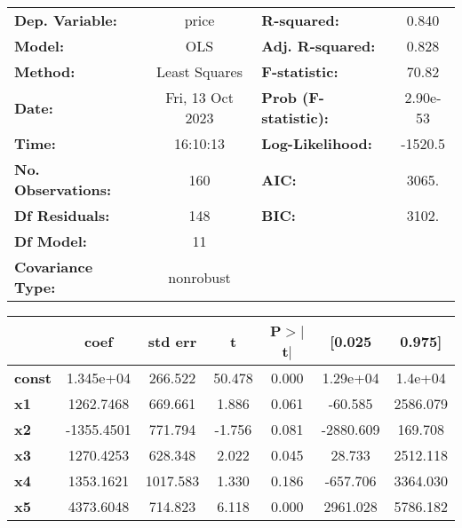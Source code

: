 \begin{center}
\begin{tabular}{lclc}
\toprule
\textbf{Dep. Variable:}    &      price       & \textbf{  R-squared:         } &     0.840   \\
\textbf{Model:}            &       OLS        & \textbf{  Adj. R-squared:    } &     0.828   \\
\textbf{Method:}           &  Least Squares   & \textbf{  F-statistic:       } &     70.82   \\
\textbf{Date:}             & Fri, 13 Oct 2023 & \textbf{  Prob (F-statistic):} &  2.90e-53   \\
\textbf{Time:}             &     16:10:13     & \textbf{  Log-Likelihood:    } &   -1520.5   \\
\textbf{No. Observations:} &         160      & \textbf{  AIC:               } &     3065.   \\
\textbf{Df Residuals:}     &         148      & \textbf{  BIC:               } &     3102.   \\
\textbf{Df Model:}         &          11      & \textbf{                     } &             \\
\textbf{Covariance Type:}  &    nonrobust     & \textbf{                     } &             \\
\bottomrule
\end{tabular}
\begin{tabular}{lcccccc}
               & \textbf{coef} & \textbf{std err} & \textbf{t} & \textbf{P$> |$t$|$} & \textbf{[0.025} & \textbf{0.975]}  \\
\midrule
\textbf{const} &    1.345e+04  &      266.522     &    50.478  &         0.000        &     1.29e+04    &      1.4e+04     \\
\textbf{x1}    &    1262.7468  &      669.661     &     1.886  &         0.061        &      -60.585    &     2586.079     \\
\textbf{x2}    &   -1355.4501  &      771.794     &    -1.756  &         0.081        &    -2880.609    &      169.708     \\
\textbf{x3}    &    1270.4253  &      628.348     &     2.022  &         0.045        &       28.733    &     2512.118     \\
\textbf{x4}    &    1353.1621  &     1017.583     &     1.330  &         0.186        &     -657.706    &     3364.030     \\
\textbf{x5}    &    4373.6048  &      714.823     &     6.118  &         0.000        &     2961.028    &     5786.182     \\

\end{tabular}
\end{center}
